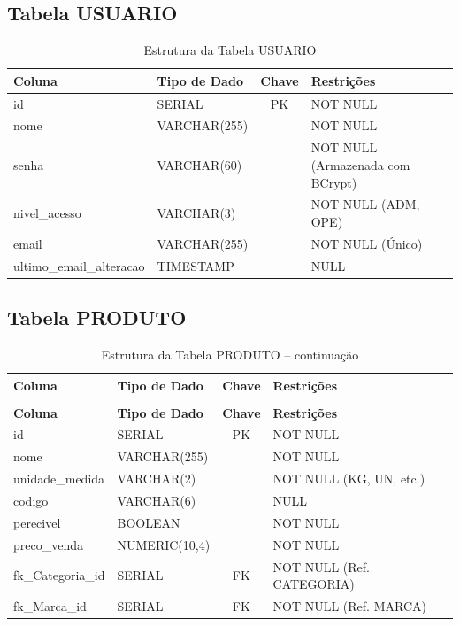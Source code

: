 \documentclass[
	12pt,				%
	openany,			%
	oneside,			%
	a4paper,			%
	english,			%
	french,				%
	spanish,			%
	brazil				%
	]{abntex2}
\begin{document}
\begin{apendicesenv}
\subsection{Tabela USUARIO}
\begin{longtable}{|l|l|c|p{6cm}|}
    \caption{Estrutura da Tabela USUARIO} \label{tab:dic_usuario} \\
    \hline \textbf{Coluna} & \textbf{Tipo de Dado} & \textbf{Chave} & \textbf{Restrições} \\ \hline
    \endfirsthead
    id & SERIAL & PK & NOT NULL \\ \hline
    nome & VARCHAR(255) & & NOT NULL \\ \hline
    senha & VARCHAR(60) & & NOT NULL (Armazenada com BCrypt) \\ \hline
    nivel\_acesso & VARCHAR(3) & & NOT NULL (ADM, OPE) \\ \hline
    email & VARCHAR(255) & & NOT NULL (Único) \\ \hline
    ultimo\_email\_alteracao & TIMESTAMP & & NULL \\ \hline
\end{longtable}

\subsection{Tabela PRODUTO}
\begin{longtable}{|l|l|c|p{6cm}|}
    \caption{Estrutura da Tabela PRODUTO} \label{tab:dic_produto} \\
    \hline \textbf{Coluna} & \textbf{Tipo de Dado} & \textbf{Chave} & \textbf{Restrições} \\ \hline
    \endfirsthead %

    \caption[]{Estrutura da Tabela PRODUTO -- continuação} \\
    \hline \textbf{Coluna} & \textbf{Tipo de Dado} & \textbf{Chave} & \textbf{Restrições} \\ \hline
    \endhead %
    id & SERIAL & PK & NOT NULL \\ \hline
    nome & VARCHAR(255) & & NOT NULL \\ \hline
    unidade\_medida & VARCHAR(2) & & NOT NULL (KG, UN, etc.) \\ \hline
    codigo & VARCHAR(6) & & NULL \\ \hline
    perecivel & BOOLEAN & & NOT NULL \\ \hline
    preco\_venda & NUMERIC(10,4) & & NOT NULL \\ \hline
    fk\_Categoria\_id & SERIAL & FK & NOT NULL (Ref. CATEGORIA) \\ \hline
    fk\_Marca\_id & SERIAL & FK & NOT NULL (Ref. MARCA) \\ \hline
\end{longtable}


\end{apendicesenv}
\end{document}
